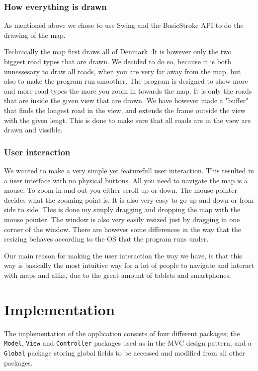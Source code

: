 \documentclass[a4paper,11pt]{article}
\begin{document}
\subsubsection{How everything is drawn} %
\label{subsub:How everything is drawn}
As mentioned above we chose to use Swing and the BasicStroke API to do the drawing of the map. 

Technically the map first draws all of Denmark. It is however only the two biggest road types that are drawn. We decided to do so, because it is both unnessesary to draw all roads, when you are very far away from the map, but also to make the program run smoother. The program is designed to show more and more road types the more you zoom in towards the map. It is only the roads that are inside the given view that are drawn. We have however made a "buffer" that finds the longest road in the view, and extends the frame outside the view with the given lengt. This is done to make sure that all roads are in the view are drawn and vissible.

\subsubsection{User interaction} %
\label{subsub:User interaction}
We wanted to make a very simple yet featurefull user interaction. This resulted in a user interface with no physical buttons. All you need to navigate the map is a mouse. To zoom in and out you either scroll up or down. The mouse pointer decides what the zooming point is. It is also very easy to go up and down or from side to side. This is done my simply dragging and dropping the map with the mouse pointer. The window is also very easily resized just by dragging in one corner of the window. There are however some differences in the way that the resizing behaves according to the OS that the program runs under.

Our main reason for making the user interaction the way we have, is that this way is basically the most intuitive way for a lot of people to navigate and interact with maps and alike, due to the great amount of tablets and smartphones.

\pagebreak
\section{Implementation} %
\label{sec:Implementation} %
The implementation of the application consists of four different packages; the \texttt{Model}, \texttt{View} and \texttt{Controller} packages used as in the MVC design pattern, and a \texttt{Global} package storing global fields to be accessed and modified from all other packages.
\end{document}
